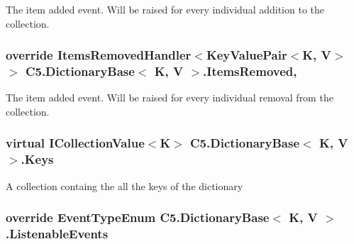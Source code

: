 The item added event. Will be raised for every individual addition to the collection. 

\hypertarget{class_c5_1_1_dictionary_base_a2bdc1bb2f3e3b2024eff8f1f8710763c}{}
\subsubsection[{Items\+Removed}]{\setlength{\rightskip}{0pt plus 5cm}override Items\+Removed\+Handler$<${\bf Key\+Value\+Pair}$<$K, V$>$ $>$ {\bf C5.\+Dictionary\+Base}$<$ K, V $>$.Items\+Removed\hspace{0.3cm}{\ttfamily [add]}, {\ttfamily [remove]}}\label{class_c5_1_1_dictionary_base_a2bdc1bb2f3e3b2024eff8f1f8710763c}


The item added event. Will be raised for every individual removal from the collection. 

\hypertarget{class_c5_1_1_dictionary_base_a42cbd2cf8d32a18b4ca17b82cf026ea5}{}
\subsubsection[{Keys}]{\setlength{\rightskip}{0pt plus 5cm}virtual {\bf I\+Collection\+Value}$<$K$>$ {\bf C5.\+Dictionary\+Base}$<$ K, V $>$.Keys\hspace{0.3cm}{\ttfamily [get]}}\label{class_c5_1_1_dictionary_base_a42cbd2cf8d32a18b4ca17b82cf026ea5}




A collection containg the all the keys of the dictionary\hypertarget{class_c5_1_1_dictionary_base_aa1a18f583bfe9f40a24d53b9638d1962}{}
\subsubsection[{Listenable\+Events}]{\setlength{\rightskip}{0pt plus 5cm}override {\bf Event\+Type\+Enum} {\bf C5.\+Dictionary\+Base}$<$ K, V $>$.Listenable\+Events\hspace{0.3cm}{\ttfamily [get]}}\label{class_c5_1_1_dictionary_base_aa1a18f583bfe9f40a24d53b9638d1962}




